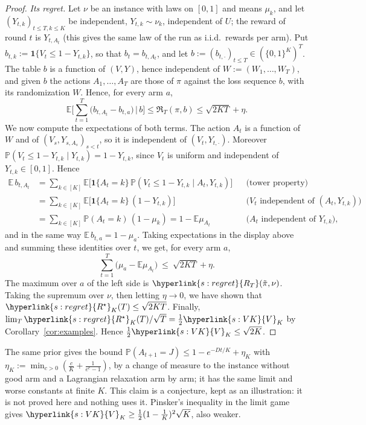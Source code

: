 \documentclass[11pt]{article}
\DeclareRobustCommand{\sy}[2]{{\hyperlink{#1}{#2}}}
\newcommand{\E}{\mathbb{E}}
\renewcommand{\P}{\mathbb{P}}
\newcommand{\1}{\mathbf{1}}
\newcommand{\RT}{\sy{s:regret}{R_T}}
\newcommand{\Rs}{\sy{s:regret}{R^\star}}
\newcommand{\VK}{\sy{s:VK}{V}}
\begin{document}
\begin{proof}
\emph{Its regret.} Let $\nu$ be an instance with laws on $[0,1]$ and means $\mu_k$, and let $(Y_{t,k})_{t\le T,k\le K}$ be independent,
$Y_{t,k}\sim\nu_k$, independent of $U$; the reward of round $t$ is $Y_{t,A_t}$ (this gives the same law of the run as i.i.d.\ rewards per arm).
Put $b_{t,k}:=\1\{V_t\le1-Y_{t,k}\}$, so that $b_t=b_{t,A_t}$, and let $b:=(b_{t,\cdot})_{t\le T}\in(\{0,1\}^K)^T$. The table $b$ is a function of
$(V,Y)$, hence independent of $W:=(W_1,\dots,W_T)$, and given $b$ the actions $A_1,\dots,A_T$ are those of $\pi$ against the loss sequence $b$, with
its randomization $W$. Hence, for every arm $a$,
\[
\E\Big[\sum_{t=1}^T\big(b_{t,A_t}-b_{t,a}\big)\,\Big|\,b\Big]\le\mathfrak R_T(\pi,b)\le\sqrt{2KT}+\eta .
\]
We now compute the expectations of both terms. The action $A_t$ is a function of $W$ and of $(V_s,Y_{s,A_s})_{s<t}$, so it is independent of
$(V_t,Y_{t,\cdot})$. Moreover $\P(V_t\le1-Y_{t,k}\mid Y_{t,k})=1-Y_{t,k}$, since $V_t$ is uniform and independent of $Y_{t,k}\in[0,1]$. Hence
\begin{align*}
\E\,b_{t,A_t}&=\sum_{k\in[K]}\E\big[\1\{A_t=k\}\,\P(V_t\le1-Y_{t,k}\mid A_t,Y_{t,k})\big] &&\text{(tower property)}\\
&=\sum_{k\in[K]}\E\big[\1\{A_t=k\}\,(1-Y_{t,k})\big] &&\text{(}V_t\text{ independent of }(A_t,Y_{t,k})\text{)}\\
&=\sum_{k\in[K]}\P(A_t=k)\,(1-\mu_k)=1-\E\mu_{A_t} &&\text{(}A_t\text{ independent of }Y_{t,k}\text{)},
\end{align*}
and in the same way $\E\,b_{t,a}=1-\mu_a$. Taking expectations in the display above and summing these identities over $t$, we get, for every arm $a$,
\[
\sum_{t=1}^T\big(\mu_a-\E\mu_{A_t}\big)\ \le\ \sqrt{2KT}+\eta .
\]
The maximum over $a$ of the left side is $\RT(\tilde\pi,\nu)$. Taking the supremum over $\nu$, then letting $\eta\to0$, we have shown that
$\Rs_K(T)\le\sqrt{2KT}$. Finally,
$\lim_T\Rs_K(T)/\sqrt T=\frac12\VK_K$ by Corollary~\ref{cor:examples}. Hence $\frac12\VK_K\le\sqrt{2K}$.
\end{proof}

\begin{remark}
The same prior gives the bound $\P(A_{t+1}=J)\le1-e^{-Dt/K}+\eta_K$ with $\eta_K:=\min_{c>0}(\frac cK+\frac1{e^c-1})$, by a change of measure to the instance without good arm
and a Lagrangian relaxation arm by arm; it has the same limit and worse constants at finite $K$. This claim is a conjecture, kept as an illustration: it is not proved here and nothing uses it. Pinsker's inequality in the limit game gives
$\VK_K\ge\frac12(1-\frac1K)^2\sqrt K$, also weaker.
\end{remark}
\end{document}
